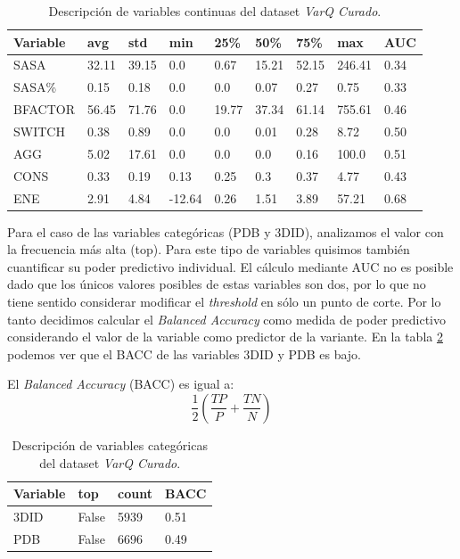 \begin{table}[H]
\centering
\begin{tabular}{|l|l|l|l|l|l|l|l|l|}
\hline
Variable & avg  & std   & min    & 25\%  & 50\%  & 75\%  & max & AUC\\ \hline
SASA    & 32.11 & 39.15 & 0.0    & 0.67  & 15.21 & 52.15 & 246.41 & 0.34 \\ \hline
SASA\%  & 0.15  & 0.18  & 0.0    & 0.0   & 0.07  & 0.27  & 0.75 & 0.33  \\ \hline
BFACTOR & 56.45 & 71.76 & 0.0    & 19.77 & 37.34 & 61.14 & 755.61 & 0.46 \\ \hline
SWITCH  & 0.38  & 0.89  & 0.0    & 0.0   & 0.01  & 0.28  & 8.72 &  0.50  \\ \hline
AGG     & 5.02  & 17.61 & 0.0    & 0.0   & 0.0   & 0.16  & 100.0 &  0.51\\ \hline
CONS    & 0.33  & 0.19  & 0.13   & 0.25  & 0.3   & 0.37  & 4.77 & 0.43\\ \hline
ENE     & 2.91  & 4.84  & -12.64 & 0.26  & 1.51  & 3.89 & 57.21 & 0.68\\ \hline 
\end{tabular}
\caption{Descripción de variables continuas del dataset \textit{VarQ Curado}.}
\label{tab:descripcion_varq_cont}
\end{table}

Para el caso de las variables categóricas (PDB y 3DID), analizamos el valor con la frecuencia más alta (top). Para este tipo de variables quisimos también cuantificar su poder predictivo individual. El cálculo mediante AUC no es posible dado que los únicos valores posibles de estas variables son dos, por lo que no tiene sentido considerar modificar el \textit{threshold} en sólo un punto de corte. Por lo tanto decidimos calcular el \textit{Balanced Accuracy} como medida de poder predictivo considerando el valor de la variable como predictor de la variante. En la tabla \ref{tab:descripcion_varq_cat} podemos ver que el BACC de las variables 3DID y PDB es bajo. 

\pagebreak

El \textit{Balanced Accuracy} (BACC) es igual a:
\begin{equation*}
    \frac{1}{2} (\frac{TP}{P} + \frac{TN}{N})
\end{equation*}



\begin{table}[H]
\centering
\begin{tabular}{|l|l|l|l|}
\hline
Variable & top  & count & BACC \\ \hline
3DID    & False & 5939 & 0.51\\ \hline
PDB  & False  & 6696 & 0.49\\ \hline
\end{tabular}
\caption{Descripción de variables categóricas del dataset \textit{VarQ Curado}.}
\label{tab:descripcion_varq_cat}
\end{table}

